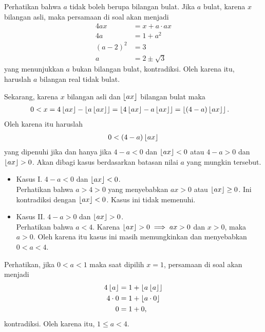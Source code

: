 
\begin{solusi}
    Perhatikan bahwa $a$ tidak boleh berupa bilangan bulat. Jika $a$ bulat, karena $x$ bilangan asli, maka persamaan di soal akan menjadi
    \begin{align*}
        4ax &= x + a\cdot ax\\
        4a &= 1 + a^2\\
        (a-2)^2 &= 3\\
        a &= 2 \pm \sqrt{3} 
    \end{align*}
    yang menunjukkan $a$ bukan bilangan bulat, kontradiksi. Oleh karena itu, haruslah $a$ bilangan real tidak bulat.
    
    Sekarang, karena $x$ bilangan asli dan $\left\lfloor ax \right\rfloor$ bilangan bulat maka
    \begin{align*}
        0 < x &= 4\left\lfloor ax \right\rfloor - \left\lfloor a\left\lfloor ax \right\rfloor \right\rfloor = \left\lfloor 4\left\lfloor ax \right\rfloor - a\left\lfloor ax \right\rfloor \right\rfloor = \left\lfloor (4-a)\left\lfloor ax \right\rfloor \right\rfloor.
    \end{align*}
    Oleh karena itu haruslah
    \begin{align*}
        0 < (4-a)\left\lfloor ax \right\rfloor
    \end{align*}
    yang dipenuhi jika dan hanya jika $4-a < 0$ dan $\left\lfloor ax \right\rfloor < 0$ atau $4-a > 0$ dan $\left\lfloor ax \right\rfloor > 0$. Akan dibagi kasus berdasarkan batasan nilai $a$ yang mungkin tersebut.
    \begin{itemize}
        \item Kasus I. $4-a < 0$ dan $\left\lfloor ax \right\rfloor < 0$.\\
        Perhatikan bahwa $a > 4 > 0$ yang menyebabkan $ax > 0$ atau $\left\lfloor ax \right\rfloor \ge 0$. Ini kontradiksi dengan $\left\lfloor ax \right\rfloor < 0$. Kasus ini tidak memenuhi.
        \item Kasus II. $4-a > 0$ dan $\left\lfloor ax \right\rfloor > 0$.\\
        Perhatikan bahwa $a < 4$. Karena $\left\lfloor ax \right\rfloor > 0 \implies ax > 0$ dan $x > 0$, maka $a > 0$. Oleh karena itu kasus ini masih memungkinkan dan menyebabkan $0 < a < 4$.
    \end{itemize}
    
    Perhatikan, jika $0 < a < 1$ maka saat dipilih $x=1$, persamaan di soal akan menjadi
    \begin{align*}
        4\left\lfloor a \right\rfloor &= 1 + \left\lfloor a\left\lfloor a \right\rfloor \right\rfloor\\
        4 \cdot 0 &= 1 + \left\lfloor a \cdot 0 \right\rfloor\\
        0 &= 1 + 0,
    \end{align*}
    kontradiksi. Oleh karena itu, $1 \le a < 4$.
    

\end{solusi}
